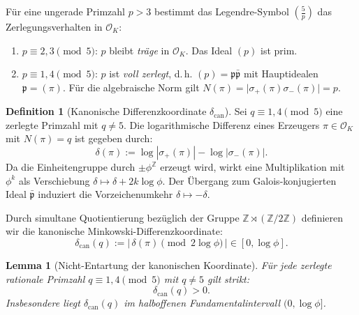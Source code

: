 \documentclass[11pt,a4paper]{article}
\theoremstyle{plain}
\newtheorem{lemma}[theorem]{Lemma}
\theoremstyle{definition}
\newtheorem{definition}[theorem]{Definition}
\newcommand{\Z}{\mathbb{Z}}
\newcommand{\OK}{\mathcal{O}_K}
\begin{document}
Für eine ungerade Primzahl $p > 3$ bestimmt das Legendre-Symbol $\left(\frac{5}{p}\right)$ das Zerlegungsverhalten in $\OK$:
\begin{enumerate}
    \item $p \equiv 2, 3 \pmod 5$: $p$ bleibt \emph{träge} in $\OK$. Das Ideal $(p)$ ist prim.
    \item $p \equiv 1, 4 \pmod 5$: $p$ ist \emph{voll zerlegt}, d.\,h. $(p) = \mathfrak{p} \bar{\mathfrak{p}}$ mit Hauptidealen $\mathfrak{p} = (\pi)$. Für die algebraische Norm gilt $N(\pi) = \vert{}\sigma_+(\pi)\sigma_-(\pi)\vert{} = p$.
\end{enumerate}

\begin{definition}[Kanonische Differenzkoordinate $\delta_{\mathrm{can}}$]
Sei $q \equiv 1, 4 \pmod 5$ eine zerlegte Primzahl mit $q \neq 5$. Die logarithmische Differenz eines Erzeugers $\pi \in \OK$ mit $N(\pi) = q$ ist gegeben durch:
\begin{equation}
    \delta(\pi) := \log |\sigma_+(\pi)| - \log |\sigma_-(\pi)|.
\end{equation}
Da die Einheitengruppe durch $\pm \phi^\Z$ erzeugt wird, wirkt eine Multiplikation mit $\phi^k$ als Verschiebung $\delta \mapsto \delta + 2k\log\phi$. Der Übergang zum Galois-konjugierten Ideal $\bar{\mathfrak{p}}$ induziert die Vorzeichenumkehr $\delta \mapsto -\delta$. 

Durch simultane Quotientierung bezüglich der Gruppe $\Z \rtimes (\Z/2\Z)$ definieren wir die kanonische Minkowski-Differenzkoordinate:
\begin{equation}
    \delta_{\mathrm{can}}(q) := \bigl|\, \delta(\pi) \pmod{2\log\phi} \,\bigr| \in [0, \log\phi].
\end{equation}
\end{definition}

\begin{lemma}[Nicht-Entartung der kanonischen Koordinate]
\label{lem:delta_pos}
Für jede zerlegte rationale Primzahl $q \equiv 1, 4 \pmod 5$ mit $q \neq 5$ gilt strikt:
\begin{equation}
    \delta_{\mathrm{can}}(q) > 0.
\end{equation}
Insbesondere liegt $\delta_{\mathrm{can}}(q)$ im halboffenen Fundamentalintervall $(0, \log\phi]$.
\end{lemma}
\end{document}
